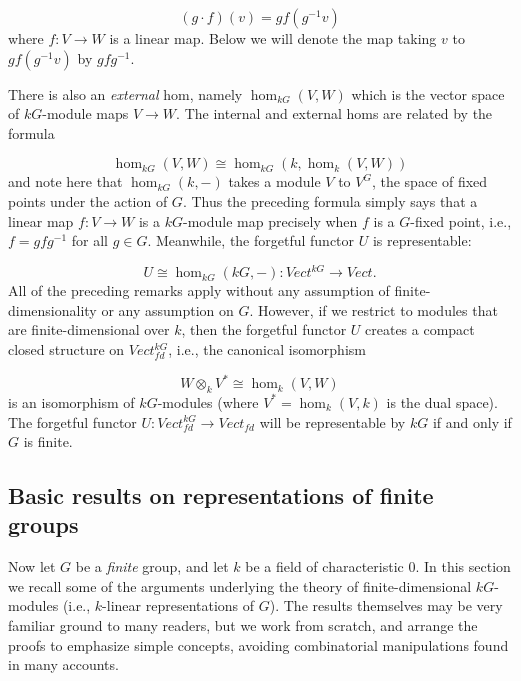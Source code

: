 \documentclass[12pt,titlepage]{article}
\theoremstyle{plain}
\theoremstyle{definition}
\theoremstyle{remark}
\begin{document}
\begin{displaymath}
(g \cdot f)(v) = g f(g^{-1} v)
\end{displaymath}
where $f: V \to W$ is a linear map. Below we will denote the map taking $v$ to $g f(g^{-1} v)$ by $g f g^{-1}$.

There is also an \emph{external} hom, namely $\hom_{k G}(V, W)$ which is the vector space of $k G$-module maps $V \to W$. The internal and external homs are related by the formula

\begin{displaymath}
\hom_{k G}(V, W) \cong \hom_{k G}(k, \hom_k(V, W))
\end{displaymath}
and note here that $\hom_{k G}(k, -)$ takes a module $V$ to $V^G$, the space of fixed points under the action of $G$. Thus the preceding formula simply says that a linear map $f: V \to W$ is a $k G$-module map precisely when $f$ is a $G$-fixed point, i.e., $f = g f g^{-1}$ for all $g \in G$. Meanwhile, the forgetful functor $U$ is representable:

\begin{displaymath}
U \cong \hom_{k G}(k G, -): Vect^{k G} \to Vect.
\end{displaymath}
All of the preceding remarks apply without any assumption of finite-dimensionality or any assumption on $G$. However, if we restrict to modules that are finite-dimensional over $k$, then the forgetful functor $U$ creates a compact closed structure on $Vect_{fd}^{k G}$, i.e., the canonical isomorphism

\begin{displaymath}
W \otimes_k V^\ast \cong \hom_k(V, W)
\end{displaymath}
is an isomorphism of $k G$-modules (where $V^\ast = \hom_k(V, k)$ is the dual space). The forgetful functor $U: Vect_{fd}^{k G} \to Vect_{fd}$ will be representable by $k G$ if and only if $G$ is finite.

\hypertarget{basic_results_on_representations_of_finite_groups}{}\subsection*{{Basic results on representations of finite groups}}\label{basic_results_on_representations_of_finite_groups}

Now let $G$ be a \emph{finite} group, and let $k$ be a field of characteristic $0$. In this section we recall some of the arguments underlying the theory of finite-dimensional $k G$-modules (i.e., $k$-linear representations of $G$). The results themselves may be very familiar ground to many readers, but we work from scratch, and arrange the proofs to emphasize simple concepts, avoiding combinatorial manipulations found in many accounts.
\end{document}
